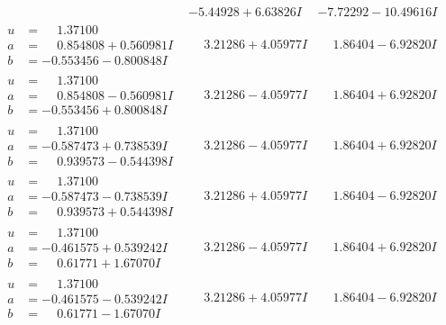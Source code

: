 \documentclass[1p]{elsarticle_modified}
\theoremstyle{definition}
\begin{document}
$$\begin{array}{c|c|c}
 & -5.44928 + 6.63826 I & -7.72292 - 10.49616 I \\ \hline\begin{aligned}
u &= \phantom{-}1.37100\phantom{ +0.000000I} \\
a &= \phantom{-}0.854808 + 0.560981 I \\
b &= -0.553456 - 0.800848 I\end{aligned}
 & \phantom{-}3.21286 + 4.05977 I & \phantom{-}1.86404 - 6.92820 I \\ \hline\begin{aligned}
u &= \phantom{-}1.37100\phantom{ +0.000000I} \\
a &= \phantom{-}0.854808 - 0.560981 I \\
b &= -0.553456 + 0.800848 I\end{aligned}
 & \phantom{-}3.21286 - 4.05977 I & \phantom{-}1.86404 + 6.92820 I \\ \hline\begin{aligned}
u &= \phantom{-}1.37100\phantom{ +0.000000I} \\
a &= -0.587473 + 0.738539 I \\
b &= \phantom{-}0.939573 - 0.544398 I\end{aligned}
 & \phantom{-}3.21286 - 4.05977 I & \phantom{-}1.86404 + 6.92820 I \\ \hline\begin{aligned}
u &= \phantom{-}1.37100\phantom{ +0.000000I} \\
a &= -0.587473 - 0.738539 I \\
b &= \phantom{-}0.939573 + 0.544398 I\end{aligned}
 & \phantom{-}3.21286 + 4.05977 I & \phantom{-}1.86404 - 6.92820 I \\ \hline\begin{aligned}
u &= \phantom{-}1.37100\phantom{ +0.000000I} \\
a &= -0.461575 + 0.539242 I \\
b &= \phantom{-}0.61771 + 1.67070 I\end{aligned}
 & \phantom{-}3.21286 - 4.05977 I & \phantom{-}1.86404 + 6.92820 I \\ \hline\begin{aligned}
u &= \phantom{-}1.37100\phantom{ +0.000000I} \\
a &= -0.461575 - 0.539242 I \\
b &= \phantom{-}0.61771 - 1.67070 I\end{aligned}
 & \phantom{-}3.21286 + 4.05977 I & \phantom{-}1.86404 - 6.92820 I \\ \hline\begin{aligned}

\end{aligned}
\end{array}$$
\end{document}
